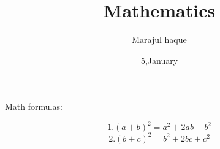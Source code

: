 \documentclass{article}
\title{Mathematics}
\author{Marajul haque}
\date{5,January}
\begin{document}
	
		Math formulas:
		
$$ 1.(a+b)^2=a^2+2ab+b^2 $$   $$ 2.(b+c)^2=b^2+2bc+c^2 $$
	
\end{document}
